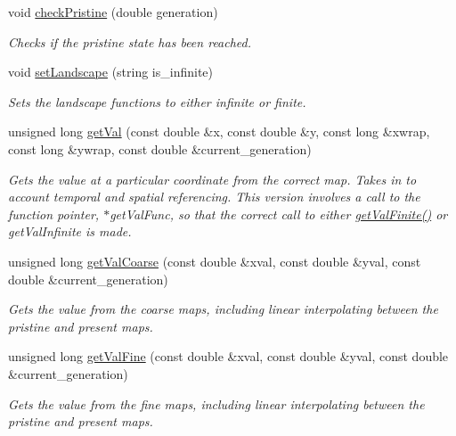 \begin{DoxyCompactItemize}
\item 
void \hyperlink{class_landscape_a5131b05f34a66951d63ec575a4aedb82}{check\+Pristine} (double generation)
\begin{DoxyCompactList}\small\item\em Checks if the pristine state has been reached. \end{DoxyCompactList}\item 
void \hyperlink{class_landscape_a63150f634d7936439bc5a1d20b84a7b2}{set\+Landscape} (string is\+\_\+infinite)
\begin{DoxyCompactList}\small\item\em Sets the landscape functions to either infinite or finite. \end{DoxyCompactList}\item 
unsigned long \hyperlink{class_landscape_a06dbce690810d8d771490c310cb96310}{get\+Val} (const double \&x, const double \&y, const long \&xwrap, const long \&ywrap, const double \&current\+\_\+generation)
\begin{DoxyCompactList}\small\item\em Gets the value at a particular coordinate from the correct map. Takes in to account temporal and spatial referencing. This version involves a call to the function pointer, $\ast$get\+Val\+Func, so that the correct call to either \hyperlink{class_landscape_a736605cefe34af236a4f8da38276a12e}{get\+Val\+Finite()} or get\+Val\+Infinite is made. \end{DoxyCompactList}\item 
unsigned long \hyperlink{class_landscape_aa98fad5a154486dbb0bca6056e19399c}{get\+Val\+Coarse} (const double \&xval, const double \&yval, const double \&current\+\_\+generation)
\begin{DoxyCompactList}\small\item\em Gets the value from the coarse maps, including linear interpolating between the pristine and present maps. \end{DoxyCompactList}\item 
unsigned long \hyperlink{class_landscape_a33a1d5c3fba6c895ad3d390a547e0361}{get\+Val\+Fine} (const double \&xval, const double \&yval, const double \&current\+\_\+generation)
\begin{DoxyCompactList}\small\item\em Gets the value from the fine maps, including linear interpolating between the pristine and present maps. \end{DoxyCompactList}\item 

\end{DoxyCompactItemize}

